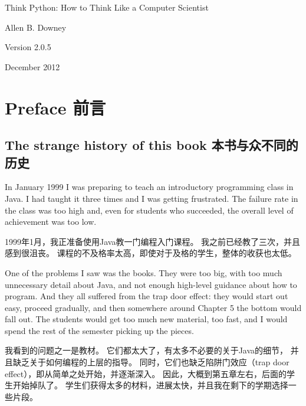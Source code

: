 \documentclass[10pt]{book}
\newcommand{\thetitle}{Think Python: How to Think Like a Computer Scientist}
\newcommand{\theversion}{2.0.5}
\newcommand{\thedate}{December 2012}
\begin{document}
\begin{CJK}{UTF8}{gbsn}
\begin{latexonly}
{} %

\end{latexonly}



\begin{htmlonly}


{\Large \thetitle}

{\large Allen B. Downey}

Version \theversion

\thedate

\setcounter{chapter}{-1}

\end{htmlonly}

\fi


\chapter{Preface 前言}

\section*{The strange history of this book 本书与众不同的历史}

In January 1999 I was preparing to teach an introductory programming
class in Java.  I had taught it three times and I was getting
frustrated.  The failure rate in the class was too high and, even for
students who succeeded, the overall level of achievement was too low.

1999年1月，我正准备使用Java教一门编程入门课程。
我之前已经教了三次，并且感到很沮丧。
课程的不及格率太高，即使对于及格的学生，整体的收获也太低。

One of the problems I saw was the books.  
They were too big, with too much unnecessary detail about Java, and
not enough high-level guidance about how to program.  And they all
suffered from the trap door effect: they would start out easy,
proceed gradually, and then somewhere around Chapter 5 the bottom would
fall out.  The students would get too much new material, too fast,
and I would spend the rest of the semester picking up the pieces.

我看到的问题之一是教材。
它们都太大了，有太多不必要的关于Java的细节，
并且缺乏关于如何编程的上层的指导。
同时，它们也缺乏陷阱门效应（trap door effect），即从简单之处开始，并逐渐深入。
因此，大概到第五章左右，后面的学生开始掉队了。
学生们获得太多的材料，进展太快，并且我在剩下的学期选择一些片段。


\end{CJK}
\end{document}
